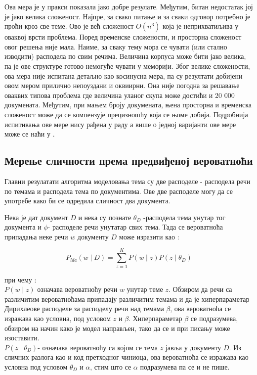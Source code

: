 Ова мера је у пракси показала јако добре резулате. Међутим, битан недостатак јој је јако велика сложеност. Најпре, за свако питање и за сваки одговор потребно је проћи кроз све теме. Ово је већ сложеност $O(n^3)$ која је неприхватиљива у оваквој врсти проблема. Поред временске сложености, и просторна сложеност овог решења није мала. Наиме, за сваку тему мора се чувати (или стално изводити) расподела по свим речима. Величина корпуса може бити јако велика, па је ове структуре готово немогуће чувати у меморији. 
Због велике сложености, ова мера није испитана детаљно као косинусна мера, па су резултати добијени овом мером прилично непоуздани и оквиирни. 
Она није погодна за решавање оваквих типова проблема где величина уланог скупа може достићи и 20 000 докумената. Међутим, при мањем броју докумената, њена просторна и временска сложеност може да се компензује прецизношћу која се њоме добија. Подробнија испитивања ове мере нису рађена у  раду а више о једној варијанти ове мере може се наћи у \cite{tm2}.

\subsection{Мерење сличности према предвиђеној вероватноћи}

Главни резулатати алгоритма моделовања тема су две расподеле - расподела речи по темама и расподела тема по документима. Ове две расподеле могу да се употребе како би се одредила сличност два документа.

Нека је дат документ $D$ и нека су познате $\theta_D$ -расподела тема унутар тог документа и $\phi$- расподеле речи унутатар свих тема. Тада се вероватноћа припадања неке речи $w$ документу $D$ може изразити као :

\begin{equation}
P_{lda}(w \mid D) = \sum_{z=1}^{K} P(w \mid z)P(z \mid \theta_D) 
\end{equation}


при чему : \\

$ P(w \mid z)$ означава вероватноћу речи $w$ унутар теме $z$. Обзиром да речи са различитим вероватноћама припадају различитим темама и да је хиперпараметар Дирихлеове расподеле за расподелу речи над темама $\beta$, ова вероватноћа се изражава као условна, под условом $z$ и $\beta$. Хиперпараметар $\beta$ се подразумева, обзиром на начин како је модел направљен, тако да се и при писању може изоставити.\\
$P(z \mid \theta_D)$- означава вероватноћу са којом се тема $z$ јавља у документу $D$. Из сличних разлога као и код претходног чиниоца, ова вероватноћа се изражава као условна под условом $\theta_D$ и $\alpha$,  стим што се $\alpha$ подразумева па се и не пише.

